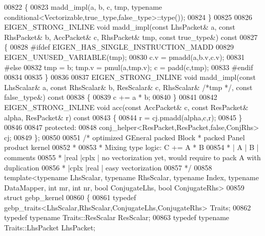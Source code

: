\begin{DoxyCode}
00822 \textcolor{keyword}{  }\{
00823     madd\_impl(a, b, c, tmp, \textcolor{keyword}{typename} conditional<Vectorizable,true\_type,false\_type>::type());
00824   \}
00825 
00826   EIGEN\_STRONG\_INLINE \textcolor{keywordtype}{void} madd\_impl(\textcolor{keyword}{const} LhsPacket& a, \textcolor{keyword}{const} RhsPacket& b, AccPacket& c, RhsPacket& tmp, \textcolor{keyword}{
      const} true\_type&)\textcolor{keyword}{ const}
00827 \textcolor{keyword}{  }\{
00828 \textcolor{preprocessor}{#ifdef EIGEN\_HAS\_SINGLE\_INSTRUCTION\_MADD}
00829     EIGEN\_UNUSED\_VARIABLE(tmp);
00830     c.v = pmadd(a,b.v,c.v);
00831 \textcolor{preprocessor}{#else}
00832     tmp = b; tmp.v = pmul(a,tmp.v); c = padd(c,tmp);
00833 \textcolor{preprocessor}{#endif}
00834     
00835   \}
00836 
00837   EIGEN\_STRONG\_INLINE \textcolor{keywordtype}{void} madd\_impl(\textcolor{keyword}{const} LhsScalar& a, \textcolor{keyword}{const} RhsScalar& b, ResScalar& c, RhsScalar& \textcolor{comment}{/*tmp
      */}, \textcolor{keyword}{const} false\_type&)\textcolor{keyword}{ const}
00838 \textcolor{keyword}{  }\{
00839     c += a * b;
00840   \}
00841 
00842   EIGEN\_STRONG\_INLINE \textcolor{keywordtype}{void} acc(\textcolor{keyword}{const} AccPacket& c, \textcolor{keyword}{const} ResPacket& alpha, ResPacket& r)\textcolor{keyword}{ const}
00843 \textcolor{keyword}{  }\{
00844     r = cj.pmadd(alpha,c,r);
00845   \}
00846 
00847 \textcolor{keyword}{protected}:
00848   conj\_helper<ResPacket,ResPacket,false,ConjRhs> cj;
00849 \};
00850 
00851 \textcolor{comment}{/* optimized GEneral packed Block * packed Panel product kernel}
00852 \textcolor{comment}{ *}
00853 \textcolor{comment}{ * Mixing type logic: C += A * B}
00854 \textcolor{comment}{ *  |  A  |  B  | comments}
00855 \textcolor{comment}{ *  |real |cplx | no vectorization yet, would require to pack A with duplication}
00856 \textcolor{comment}{ *  |cplx |real | easy vectorization}
00857 \textcolor{comment}{ */}
00858 \textcolor{keyword}{template}<\textcolor{keyword}{typename} LhsScalar, \textcolor{keyword}{typename} RhsScalar, \textcolor{keyword}{typename} Index, \textcolor{keyword}{typename} DataMapper, \textcolor{keywordtype}{int} mr, \textcolor{keywordtype}{int} nr, \textcolor{keywordtype}{bool} 
      ConjugateLhs, \textcolor{keywordtype}{bool} ConjugateRhs>
00859 \textcolor{keyword}{struct }gebp\_kernel
00860 \{
00861   \textcolor{keyword}{typedef} gebp\_traits<LhsScalar,RhsScalar,ConjugateLhs,ConjugateRhs> Traits;
00862   \textcolor{keyword}{typedef} \textcolor{keyword}{typename} Traits::ResScalar ResScalar;
00863   \textcolor{keyword}{typedef} \textcolor{keyword}{typename} Traits::LhsPacket LhsPacket;

\end{DoxyCode}
